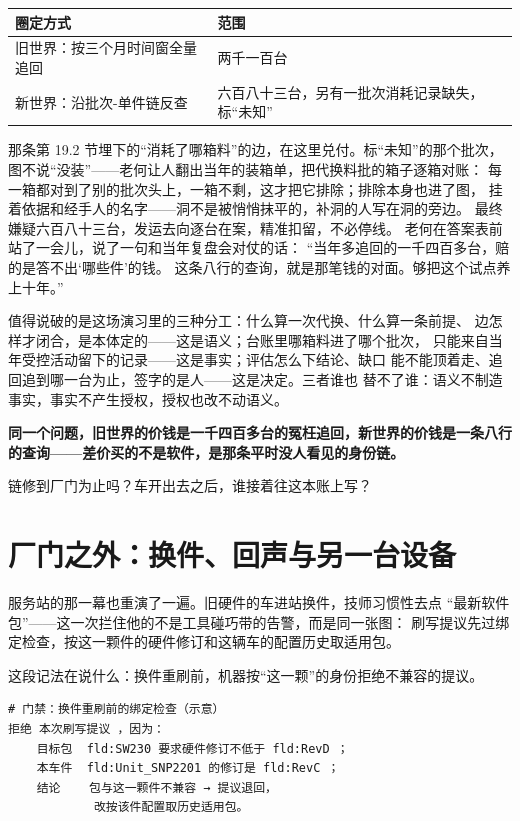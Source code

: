 \begin{center}
\begingroup\small
\setlength{\tabcolsep}{4pt}
\begin{tabularx}{\linewidth}{@{}XX@{}}
\toprule
圈定方式 & 范围 \\
\midrule
旧世界：按三个月时间窗全量追回 & 两千一百台 \\
新世界：沿批次-单件链反查 & 六百八十三台，另有一批次消耗记录缺失，标“未知” \\
\bottomrule
\end{tabularx}
\endgroup
\end{center}

那条第 19.2 节埋下的“消耗了哪箱料”的边，在这里兑付。标“未知”的那个批次，
图不说“没装”——老何让人翻出当年的装箱单，把代换料批的箱子逐箱对账：
每一箱都对到了别的批次头上，一箱不剩，这才把它排除；排除本身也进了图，
挂着依据和经手人的名字——洞不是被悄悄抹平的，补洞的人写在洞的旁边。
最终嫌疑六百八十三台，发运去向逐台在案，精准扣留，不必停线。
老何在答案表前站了一会儿，说了一句和当年复盘会对仗的话：
“当年多追回的一千四百多台，赔的是答不出‘哪些件’的钱。
这条八行的查询，就是那笔钱的对面。够把这个试点养上十年。”

值得说破的是这场演习里的三种分工：什么算一次代换、什么算一条前提、
边怎样才闭合，是本体定的——这是语义；台账里哪箱料进了哪个批次，
只能来自当年受控活动留下的记录——这是事实；评估怎么下结论、缺口
能不能顶着走、追回追到哪一台为止，签字的是人——这是决定。三者谁也
替不了谁：语义不制造事实，事实不产生授权，授权也改不动语义。

\textbf{同一个问题，旧世界的价钱是一千四百多台的冤枉追回，新世界的价钱是一条八行的查询——差价买的不是软件，是那条平时没人看见的身份链。}

链修到厂门为止吗？车开出去之后，谁接着往这本账上写？

\section{厂门之外：换件、回声与另一台设备}

服务站的那一幕也重演了一遍。旧硬件的车进站换件，技师习惯性去点
“最新软件包”——这一次拦住他的不是工具碰巧带的告警，而是同一张图：
刷写提议先过绑定检查，按这一颗件的硬件修订和这辆车的配置历史取适用包。

这段记法在说什么：换件重刷前，机器按“这一颗”的身份拒绝不兼容的提议。

\nopagebreak[4]
\begin{codebox}
\begin{Verbatim}[fontsize=\small,breaklines=true,breakanywhere=true,breaksymbolleft={},breaksymbolright={}]
# 门禁：换件重刷前的绑定检查（示意）
拒绝 本次刷写提议 ，因为：
    目标包  fld:SW230 要求硬件修订不低于 fld:RevD ；
    本车件  fld:Unit_SNP2201 的修订是 fld:RevC ；
    结论    包与这一颗件不兼容 → 提议退回，
            改按该件配置取历史适用包。
\end{Verbatim}
\end{codebox}

